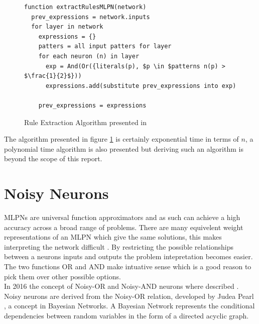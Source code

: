 \begin{figure}[H]
\begin{lstlisting}[mathescape=true]
function extractRulesMLPN(network)
  prev_expressions = network.inputs
  for layer in network
    expressions = {}
    patters = all input patters for layer
    for each neuron (n) in layer
      exp = And(Or({literals(p), $p \in $patterns n(p) > $\frac{1}{2}$}))
      expressions.add(substitute prev_expressions into exp)
	  
    prev_expressions = expressions
\end{lstlisting}
	\caption{Rule Extraction Algorithm presented in \cite{tsukimoto2000extracting}}
	\label{alg:rule-extraction-tsukimoto}
\end{figure}

The algorithm presented in figure \ref{alg:rule-extraction-tsukimoto} is certainly exponential time in terms of $n$, a polynomial time algorithm is also presented but deriving such an algorithm is beyond the scope of this report.\\

\section{Noisy Neurons} \label{sec:background-noisy-neurons}
MLPNs are universal function approximators and as such can achieve a high accuracy across a broad range of problems. There are many equivelent weight representations of an MLPN which give the same solutions, this makes interpreting the network difficult \cite{LearningLogicalActivations}. By restricting the possible relationships between a neurons inputs and outputs the problem intepretation becomes easier. The two functions OR and AND make intuative sense which is a good reason to pick them over other possible options.\\
 
In 2016 the concept of Noisy-OR and Noisy-AND neurons where described \cite{LearningLogicalActivations}. Noisy neurons are derived from the Noisy-OR relation\cite{LearningLogicalActivations}, developed by Judea Pearl \cite{russell1995modern}, a concept in Bayesian Networks. A Bayesian Network represents the conditional dependencies between random variables in the form of a directed acyclic graph.

